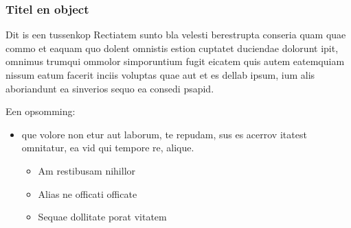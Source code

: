 \documentclass[xcolor=table,10pt,t]{beamer}
\begin{document}
\begin{frame}
    \frametitle{Titel en object}

    \begin{block}{Dit is een tussenkop}
    Rectiatem sunto bla velesti berestrupta conseria quam quae commo et eaquam quo dolent omnistis estion cuptatet duciendae dolorunt ipit, omnimus trumqui ommolor simporuntium fugit eicatem quis autem eatemquiam nissum eatum facerit inciis voluptas quae aut et es dellab ipsum, ium alis aboriandunt ea sinverios sequo ea consedi psapid.
    \end{block}

    \begin{block}{}
    Een opsomming:
    \begin{itemize}
        \item que volore non etur aut laborum, te repudam, sus es acerrov itatest omnitatur, ea vid qui tempore re, alique.
        \begin{itemize}
            \item Am restibusam nihillor 
            \item Alias ne officati officate
            \item Sequae dollitate porat vitatem
        \end{itemize}
    \end{itemize}
    \end{block}
\end{frame}
\end{document}
